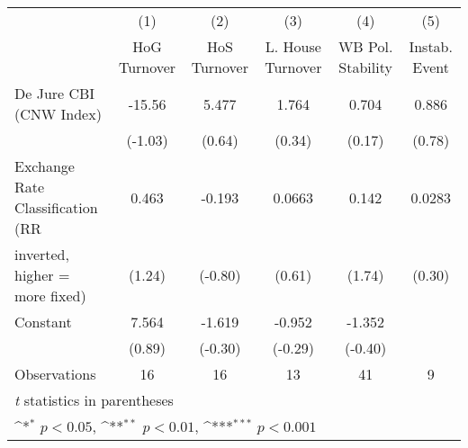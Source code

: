 \begin{table}[htbp]\centering
\def\sym#1{\ifmmode^{#1}\else\(^{#1}\)\fi}
\caption{\label{NOhoshogIfivs3}}
\begin{tabular}{l*{5}{c}}
\toprule
                                        &\multicolumn{1}{c}{(1)}&\multicolumn{1}{c}{(2)}&\multicolumn{1}{c}{(3)}&\multicolumn{1}{c}{(4)}&\multicolumn{1}{c}{(5)}\\
                                        &\multicolumn{1}{c}{HoG Turnover}&\multicolumn{1}{c}{HoS Turnover}&\multicolumn{1}{c}{L. House Turnover}&\multicolumn{1}{c}{WB Pol. Stability}&\multicolumn{1}{c}{Instab. Event}\\
\midrule
De Jure CBI (CNW Index)                 &   -15.56         &    5.477         &    1.764         &    0.704         &    0.886         \\
                                        &  (-1.03)         &   (0.64)         &   (0.34)         &   (0.17)         &   (0.78)         \\
\addlinespace
Exchange Rate Classification (RR        &    0.463         &   -0.193         &   0.0663         &    0.142         &   0.0283         \\
inverted, higher = more fixed)          &   (1.24)         &  (-0.80)         &   (0.61)         &   (1.74)         &   (0.30)         \\
\addlinespace
Constant                                &    7.564         &   -1.619         &   -0.952         &   -1.352         &                  \\
                                        &   (0.89)         &  (-0.30)         &  (-0.29)         &  (-0.40)         &                  \\
\midrule
Observations                            &       16         &       16         &       13         &       41         &        9         \\
\bottomrule
\multicolumn{6}{l}{\footnotesize \textit{t} statistics in parentheses}\\
\multicolumn{6}{l}{\footnotesize \sym{*} \(p<0.05\), \sym{**} \(p<0.01\), \sym{***} \(p<0.001\)}\\
\end{tabular}
\end{table}
